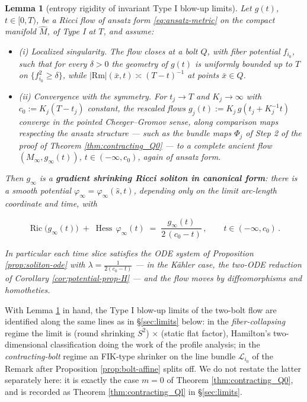 \documentclass[11pt]{amsart}
\theoremstyle{plain}
\numberwithin{equation}{section}
\newtheorem{lemma}[theorem]{Lemma}
\theoremstyle{definition}
\theoremstyle{remark}
\begin{document}
\begin{lemma}[entropy rigidity of invariant Type I blow-up limits]\label{lem:entropy-rigidity}
	Let $g ( t )$, $t \in [ 0, T )$, be a Ricci flow of ansatz form \eqref{eq:ansatz-metric} on the compact manifold $\widehat{M}$, of Type I at $T$, and assume:
	
	\begin{itemize}
		\item \emph{(i) Localized singularity.} The flow closes at a bolt $Q$, with fiber potential $f_{i_0}$, such that for every $\delta > 0$ the geometry of $g ( t )$ is uniformly bounded up to $T$ on $\{ f_{i_0}^2 \geq \delta \}$, while $| \mathrm{Rm} | ( \bar{x}, t ) \asymp ( T - t )^{-1}$ at points $\bar{x} \in Q$.
		\item \emph{(ii) Convergence with the symmetry.} For $t_j \to T$ and $K_j \to \infty$ with $c_0 := K_j ( T - t_j )$ constant, the rescaled flows $g_j ( t ) := K_j\, g ( t_j + K_j^{-1} t )$ converge in the pointed Cheeger--Gromov sense, along comparison maps respecting the ansatz structure --- such as the bundle maps $\Phi_j$ of Step 2 of the proof of Theorem \ref{thm:contracting_Q0} --- to a complete ancient flow $( M_\infty, g_\infty ( t ) )$, $t \in ( - \infty, c_0 )$, again of ansatz form.
	\end{itemize}
	
	Then $g_\infty$ is a \textbf{gradient shrinking Ricci soliton in canonical form}: there is a smooth potential $\varphi_\infty = \varphi_\infty ( \hat{s}, t )$, depending only on the limit arc-length coordinate and time, with
	
	\begin{equation}\label{eq:entropy-rigidity}
		\operatorname{Ric} \big( g_\infty ( t ) \big) \;+\; \operatorname{Hess}\, \varphi_\infty ( t ) \;=\; \frac{g_\infty ( t )}{2 \, ( c_0 - t )} \,, \qquad t \in ( - \infty, c_0 ) \,.
	\end{equation}
	
	In particular each time slice satisfies the ODE system of Proposition \ref{prop:soliton-ode} with $\lambda = \tfrac{1}{2 ( c_0 - t )}$ --- in the Kähler case, the two-ODE reduction of Corollary \ref{cor:potential-prop-H} --- and the flow moves by diffeomorphisms and homotheties.
	
\end{lemma}


With Lemma \ref{lem:entropy-rigidity} in hand, the Type I blow-up limits of the two-bolt flow are identified along the same lines as in \S\ref{sec:limits} below: in the \emph{fiber-collapsing} regime the limit is (round shrinking $S^2$) $\times$ (static flat factor), Hamilton's two-dimensional classification doing the work of the profile analysis; in the \emph{contracting-bolt} regime an FIK-type shrinker on the line bundle $\mathcal{L}_{i_0}$ of the Remark after Proposition \ref{prop:bolt-affine} splits off. We do not restate the latter separately here: it is exactly the case $m = 0$ of Theorem \ref{thm:contracting_Q0}, and is recorded as Theorem \ref{thm:contracting_Ql} in \S\ref{sec:limits}.
\end{document}
